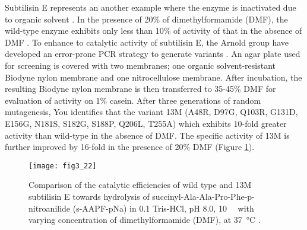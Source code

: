 \begin{refsection}
Subtilisin E represents an another example where the enzyme is inactivated due
to organic solvent \cite{You1996}. In the presence of 20\% of dimethylformamide
(DMF), the wild-type enzyme exhibits only less than 10\% of activity of that in
the absence of DMF \cite{You1996}. To enhance to catalytic activity of
subtilisin E, the Arnold group have developed an error-prone PCR strategy to
generate variants \cite{You1996}. An agar plate used for screening is covered
with two membranes; one organic solvent-resistant Biodyne nylon membrane and
one nitrocellulose membrane. After incubation, the resulting Biodyne nylon
membrane is then transferred to 35-45\% DMF for evaluation of activity on 1\%
casein. After three generations of random mutagenesis, You 
identifies that the variant 13M (A48R, D97G, Q103R, G131D, E156G, N181S, S182G,
S188P, Q206L, T255A) which exhibits 10-fold greater activity than wild-type in
the absence of DMF. The specific activity of 13M is further improved by
16-fold in the presence of 20\% DMF \cite{You1996} (Figure \ref{fig:arnold}). 
\begin{figure}[htbp] \centering \texttt{[image: fig3\_22]}
    \caption[Comparison of the catalytic efficiencies of wild type and 13M
    subtilisin E towards hydrolysis of succinyl-Ala-Ala-Pro-Phe-p-nitroanilide
    (s-AAPF-pNa) in \SI{0.1}{\Molar} Tris-HCl, pH 8.0,
    \SI{10}{\milli\Molar}{} with varying concentration of
    dimethylformamide (DMF), at \SI{37}{\celsius}.]{Comparison of the catalytic
        efficiencies of wild type and 13M subtilisin E towards hydrolysis of
        succinyl-Ala-Ala-Pro-Phe-p-nitroanilide (s-AAPF-pNa) in
        \SI{0.1}{\Molar} Tris-HCl, pH 8.0, \SI{10}{\milli\Molar}{}
        with varying concentration of dimethylformamide (DMF), at
        \SI{37}{\celsius}  \cite{You1996}.} \label{fig:arnold}
\end{figure}


\end{refsection}

